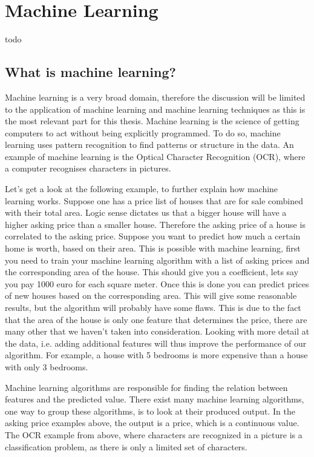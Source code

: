 \chapter{Machine Learning}
{\samenvatting todo }


\section{What is machine learning?}
Machine learning is a very broad domain, therefore the discussion will be limited to the application of machine learning and machine learning techniques as this is the most relevant part for this thesis. Machine learning is the science of getting computers to act without being explicitly programmed. To do so, machine learning uses pattern recognition to find patterns or structure in the data. An example of machine learning is the Optical Character Recognition (OCR), where a computer recognises characters in pictures.

\npar

Let's get a look at the following example, to further explain how machine learning works. Suppose one has a price list of houses that are for sale combined with their total area. Logic sense dictates us that a bigger house will have a higher asking price than a smaller house. Therefore the asking price of a house is correlated to the asking price. Suppose you want to predict how much a certain home is worth, based on their area. This is possible with machine learning, first you need to train your machine learning algorithm with a list of asking prices and the corresponding area of the house. This should give you a coefficient, lets say you pay 1000 euro for each square meter. Once this is done you can predict prices of new houses based on the corresponding area. 
\npar
This will give some reasonable results, but the algorithm will probably have some flaws. This is due to the fact that the area of the house is only one feature that determines the price, there are many other that we haven't taken into consideration. Looking with more detail at the data, i.e. adding additional features will thus improve the performance of our algorithm. For example, a house with 5 bedrooms is more expensive than a house with only 3 bedrooms.

\npar

Machine learning algorithms are responsible for finding the relation between features and the predicted value. There exist many machine learning algorithms, one way to group these algorithms, is to look at their produced output. In the asking price examples above, the output is a price, which is a continuous value. The OCR example from above, where characters are recognized in a picture is a classification problem, as there is only a limited set of characters. 

